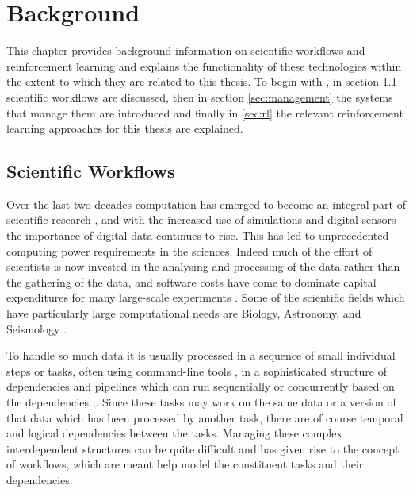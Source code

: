 
\cleardoublepage
\chapter{Background}
\label{cha:background}


This chapter provides background information on scientific workflows and reinforcement learning and explains the functionality of these technologies within the extent to which they are related to this thesis. To begin with , in section \ref{sec:workflows} scientific workflows are discussed, then in section \ref{sec:management} the systems that manage them are introduced and finally in \ref{sec:rl} the relevant reinforcement learning approaches for this thesis are explained. 


\section{Scientific Workflows}
\label{sec:workflows}

Over the last two decades computation has emerged to become an integral part of scientific research \cite{deelman},\cite{parallelization} and with the increased use of simulations and digital sensors the importance of digital data continues to rise\cite{ScientificWorkflows}. This has led to unprecedented computing power requirements in the sciences. Indeed much of the effort of scientists is now invested in the analysing and processing of the data rather than the gathering of the data, and software costs have come to dominate capital expenditures for many large-scale experiments \cite{Gray}. Some of the scientific fields which have particularly large computational needs are Biology, Astronomy, and Seismology \cite{ScientificWorkflows}. 

To handle so much data it is usually processed in a sequence of small individual steps or tasks, often using command-line tools \cite{FeedbackBasedAllocation}, in a sophisticated structure of dependencies and pipelines which can run sequentially or concurrently based on the dependencies \cite{parallelization},\cite{examining}. Since these tasks may work on the same data or a version of that data which has been processed by another task, there are of course temporal and logical dependencies between the tasks. Managing these complex interdependent structures can be quite difficult and has given rise to the concept of workflows, which are meant help model the constituent tasks and their dependencies. 

